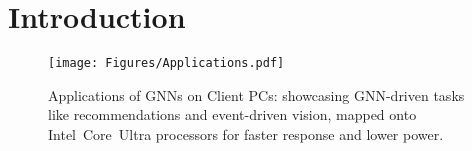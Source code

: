 \section{Introduction}\label{sec:intro}

\begin{figure}[t!]
\begin{center}
\texttt{[image: Figures/Applications.pdf]}%
\end{center}
\caption{Applications of GNNs on Client PCs: showcasing GNN-driven tasks like recommendations and event-driven vision, mapped onto Intel\textregistered\ Core\texttrademark\ Ultra processors for faster response and lower power.}\label{fig:Applications}
\end{figure}

